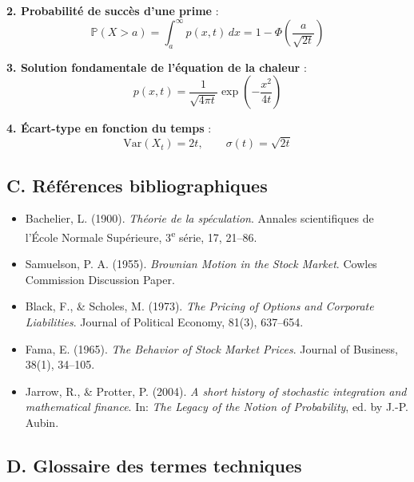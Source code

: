 \documentclass[12pt,a4paper]{article}
\begin{document}
\textbf{2. Probabilité de succès d’une prime} :
\[
\mathbb{P}(X > a) = \int_a^{\infty} p(x,t)\, dx = 1 - \Phi\left(\frac{a}{\sqrt{2t}}\right)
\]

\textbf{3. Solution fondamentale de l’équation de la chaleur} :
\[
p(x,t) = \frac{1}{\sqrt{4\pi t}} \exp\left(-\frac{x^2}{4t}\right)
\]

\textbf{4. Écart-type en fonction du temps} :
\[
\text{Var}(X_t) = 2t, \qquad \sigma(t) = \sqrt{2t}
\]

\subsection*{C. Références bibliographiques}

\begin{itemize}
    \item Bachelier, L. (1900). \textit{Théorie de la spéculation}. Annales scientifiques de l’École Normale Supérieure, 3\textsuperscript{e} série, 17, 21–86.

    \item Samuelson, P. A. (1955). \textit{Brownian Motion in the Stock Market}. Cowles Commission Discussion Paper.

    \item Black, F., \& Scholes, M. (1973). \textit{The Pricing of Options and Corporate Liabilities}. Journal of Political Economy, 81(3), 637–654.

    \item Fama, E. (1965). \textit{The Behavior of Stock Market Prices}. Journal of Business, 38(1), 34–105.

    \item Jarrow, R., \& Protter, P. (2004). \textit{A short history of stochastic integration and mathematical finance}. In: \textit{The Legacy of the Notion of Probability}, ed. by J.-P. Aubin.
\end{itemize}

\subsection*{D. Glossaire des termes techniques}
\end{document}
